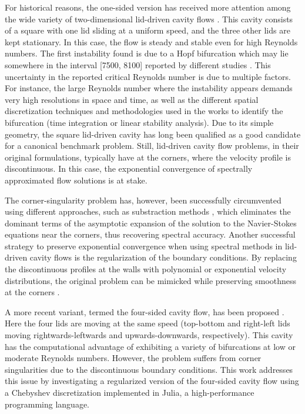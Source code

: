 For historical reasons, the one-sided version has received more attention among
the wide variety of two-dimensional lid-driven cavity flows
\citep{kuhlmann2019}. This cavity consists of a square with one lid sliding at
a uniform speed, and the three other lids are kept stationary. In this case,
the flow is steady and stable even for high Reynolds numbers. The first
instability found is due to a Hopf bifurcation which may lie somewhere in the
interval [7500, 8100] reported by different studies \citep{kuhlmann2019}. This
uncertainty in the reported critical Reynolds number is due to multiple
factors. For instance,  the large Reynolds number where the instability appears
demands very high resolutions in space and time, as well as the different
spatial discretization techniques and methodologies used in the works to
identify the bifurcation (time integration or linear stability analysis). Due
to its simple geometry, the square lid-driven cavity has long been qualified as
a good candidate for a canonical benchmark problem. Still, lid-driven cavity
flow problems, in their original formulations, typically have  at the corners, where the velocity profile is
discontinuous. In this case, the exponential convergence of spectrally
approximated flow solutions is at stake. 

The corner-singularity problem has, however, been successfully circumvented
using different approaches, such as substraction methods \citep{botella1998},
which eliminates the dominant terms of the asymptotic expansion of the solution
to the Navier-Stokes equations near the corners, thus recovering spectral
accuracy. Another successful strategy to preserve exponential convergence when
using spectral methods in lid-driven cavity flows is the regularization of the
boundary conditions. By replacing the discontinuous profiles at the walls with
polynomial or exponential velocity distributions, the original problem can be
mimicked while preserving smoothness at the corners \citep{shen1991,
lopez2017}.

A more recent variant, termed the four-sided cavity flow, has been proposed
\citep{wahba2009}. Here the four lids are moving at the same speed (top-bottom
and right-left lids moving rightwards-leftwards and upwards-downwards,
respectively). This cavity has the computational advantage of exhibiting a
variety of bifurcations at low or moderate Reynolds numbers. However, the
problem suffers from corner singularities due to the discontinuous boundary
conditions. This work addresses this issue by investigating a regularized
version of the four-sided cavity flow using a Chebyshev discretization
implemented in Julia, a high-performance programming language.

